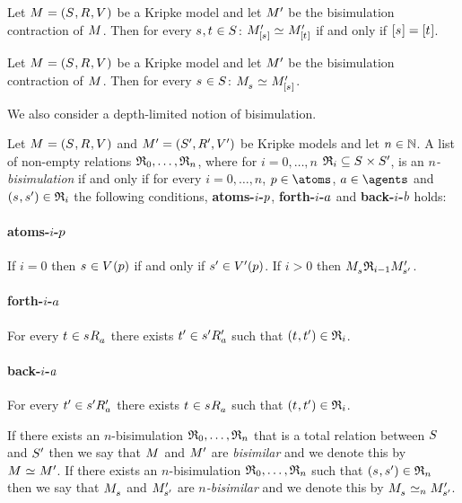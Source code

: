 \begin{proposition}
Let $\kModelAndTuple$ be a Kripke model and let ${M^{\prime}_{}}$ be the bisimulation contraction of $\kModel$.
Then for every $\kStateS, \kStateT \in \kStates$: $\kPModelP{[\kStateS]} \bisimilar \kPModelP{[\kStateT]}$ if and only if $[\kStateS] = [\kStateT]$.
\end{proposition}

\begin{proposition}
Let $\kModelAndTuple$ be a Kripke model and let ${M^{\prime}_{}}$ be the bisimulation contraction of $\kModel$.
Then for every $\kStateS \in \kStates$: $\kPModel{\kStateS} \bisimilar \kPModelP{[\kStateS]}$.
\end{proposition}

We also consider a depth-limited notion of bisimulation.

\begin{definition}[$n$-bisimulation]
Let $\kModelAndTuple$ and $\kModelAndTupleP$ be Kripke models and let $n \in \mathbb{N}$.
A list of non-empty relations $\mathfrak{R}_0, \dots, \mathfrak{R}_n$, where for $i = 0, \dots, n$ $\bisimulation_i \subseteq \kStates \times \kStatesP$, is an {\em $n$-bisimulation} if and only if for every $i = 0, \dots, n$, $\atomP \in \atoms$, $\agentA \in \agents$ and $(\kStateS, \kStateSP) \in \bisimulation_i$ the following conditions, {\bf atoms-$i$-$p$}, {\bf forth-$i$-$a$} and {\bf back-$i$-$b$} holds:

\paragraph{atoms-$i$-$p$}
If $i = 0$ then $\kStateS \in \kValuation(\atomP)$ if and only if ${s}^{\prime} \in {V^{\prime}}(p)$.
If $i > 0$ then $\kPModel{\kStateS} \bisimulation_{i-1} \kPModelP{\kStateSP}$.

\paragraph{forth-$i$-$a$}
For every $\kStateT \in \kSuccessorsA{\kStateS}$ there exists ${t}^{\prime} \in {{s}^{\prime}} {R^{\prime}_{a}}$ such that $(\kStateT, \kStateTP) \in \bisimulation_i$.

\paragraph{back-$i$-$a$}
For every ${t}^{\prime} \in {{s}^{\prime}} {R^{\prime}_{a}}$ there exists $\kStateT \in \kSuccessorsA{\kStateS}$ such that $(\kStateT, \kStateTP) \in \bisimulation_i$.

If there exists an $n$-bisimulation $\mathfrak{R}_0, \dots, \mathfrak{R}_n$ that is a total relation between $\kStates$ and ${S^{\prime}}$ then we say that $\kModel$ and ${M^{\prime}_{}}$ are {\em bisimilar} and we denote this by $\kModel \bisimilar \kModelP$.
If there exists an $n$-bisimulation $\mathfrak{R}_0, \dots, \mathfrak{R}_n$ such that $(\kStateS, \kStateSP) \in \bisimulation_n$ then we say that $\kPModel{\kStateS}$ and ${M^{\prime}_{{s}^{\prime}}}$ are {\em $n$-bisimilar} and we denote this by $\kPModel{\kStateS} \bisimilar[n] \kPModelP{\kStateSP}$.
\end{definition}

